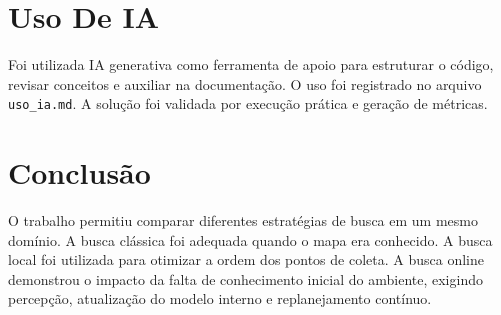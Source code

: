 \documentclass[12pt,a4paper]{article}
\begin{document}
\section{Uso De IA}

Foi utilizada IA generativa como ferramenta de apoio para estruturar o código, revisar conceitos e auxiliar na documentação. O uso foi registrado no arquivo \texttt{uso\_ia.md}. A solução foi validada por execução prática e geração de métricas.

\section{Conclusão}

O trabalho permitiu comparar diferentes estratégias de busca em um mesmo domínio. A busca clássica foi adequada quando o mapa era conhecido. A busca local foi utilizada para otimizar a ordem dos pontos de coleta. A busca online demonstrou o impacto da falta de conhecimento inicial do ambiente, exigindo percepção, atualização do modelo interno e replanejamento contínuo.
\end{document}
